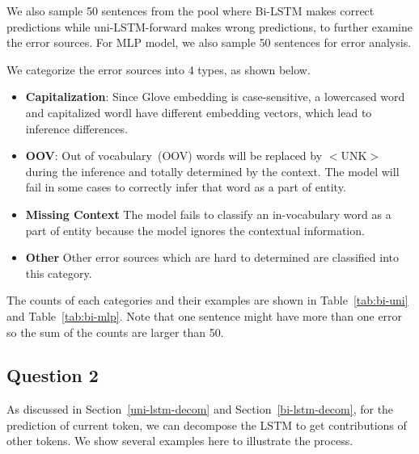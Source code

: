 \documentclass{article}
\begin{document}
We also sample 50 sentences from the pool where Bi-LSTM makes correct predictions while uni-LSTM-forward makes wrong predictions, to further examine the error sources. For MLP model, we also sample 50 sentences for error analysis.

We categorize the error sources into 4 types, as shown below.

\begin{itemize}
	\item \textbf{Capitalization}: Since Glove embedding is case-sensitive, a lowercased word and capitalized wordl have different embedding vectors, which lead to inference differences. 
	\item \textbf{OOV}: Out of vocabulary~(OOV) words will be replaced by $<$UNK$>$ during the inference and totally determined by the context. The model will fail in some cases to correctly infer that word as a part of entity.
	\item \textbf{Missing Context} The model fails to classify an in-vocabulary word as a part of entity because the model ignores the contextual information. 
	\item \textbf{Other} Other error sources which are hard to determined are classified into this category.
\end{itemize}

The counts of each categories and their examples are shown in Table~\ref{tab:bi-uni} and Table~\ref{tab:bi-mlp}. Note that one sentence might have more than one error so the sum of the counts are larger than 50.


\subsection{Question 2}

As discussed in Section~\ref{uni-lstm-decom} and Section~\ref{bi-lstm-decom}, for the prediction of current token, we can decompose the LSTM to get contributions of other tokens. We show several examples here to illustrate the process.
\end{document}
